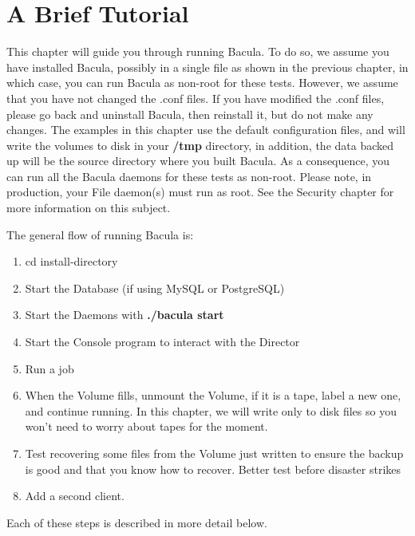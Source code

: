 
\chapter{A Brief Tutorial}
\label{TutorialChapter}

This chapter will guide you through running Bacula. To do so, we assume you
have installed Bacula, possibly in a single file as shown in the previous
chapter, in which case, you can run Bacula as non-root for these tests.
However, we assume that you have not changed the .conf files. If you have
modified the .conf files, please go back and uninstall Bacula, then reinstall
it, but do not make any changes. The examples in this chapter use the default
configuration files, and will write the volumes to disk in your {\bf /tmp}
directory, in addition, the data backed up will be the source directory where
you built Bacula. As a consequence, you can run all the Bacula daemons for
these tests as non-root. Please note, in production, your File daemon(s) must
run as root. See the Security chapter for more information on this subject. 


The general flow of running Bacula is: 

\begin{enumerate}
\item cd \lt{}install-directory\gt{}  
\item Start the Database (if using MySQL or PostgreSQL)  
\item Start the Daemons with {\bf ./bacula start}  
\item Start the Console program to interact with the Director  
\item Run a job  
\item When the Volume fills, unmount the Volume, if it is a  tape, label a new
   one, and continue running. In this  chapter, we will write only to disk files
   so you won't  need to worry about tapes for the moment. 
\item Test recovering some files from the Volume just written to  ensure the
   backup is good and that you know how to recover.  Better test before disaster
   strikes  
\item Add a second client. 
   \end{enumerate}

Each of these steps is described in more detail below. 

